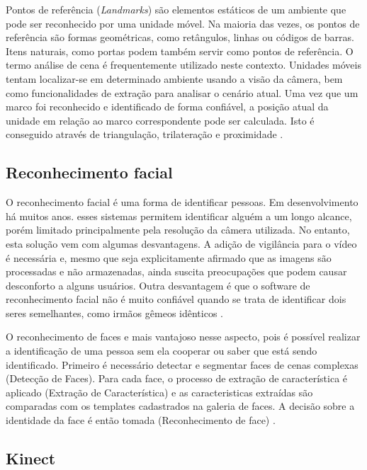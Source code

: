 Pontos de referência (\textit{Landmarks}) são elementos estáticos de um ambiente que pode ser reconhecido por uma unidade móvel. Na maioria das vezes, os pontos de referência são formas geométricas, como retângulos, linhas ou códigos de barras. Itens naturais, como portas podem também servir como pontos de referência. O termo  análise de cena é frequentemente utilizado neste contexto. Unidades móveis tentam localizar-se  em determinado ambiente usando a visão da câmera, bem como funcionalidades de extração para analisar o cenário atual. Uma vez que um marco foi reconhecido e identificado de forma confiável, a posição atual da unidade em relação ao marco correspondente pode ser calculada. Isto é conseguido através de triangulação, trilateração e proximidade \cite{linde2006aspects}.


 \subsection{Reconhecimento facial}\label{sec:recFacial}
O reconhecimento facial é uma forma de identificar pessoas. Em desenvolvimento há muitos anos. esses sistemas permitem identificar alguém a um longo alcance, porém limitado principalmente pela resolução da câmera utilizada. No entanto, esta solução vem com algumas desvantagens. A adição de vigilância para o vídeo é necessária e, mesmo que seja explicitamente afirmado que as imagens são processadas e não armazenadas, ainda suscita preocupações que podem causar desconforto a alguns usuários. Outra desvantagem é que o software de reconhecimento facial não é muito confiável quando se trata de identificar dois seres semelhantes, como irmãos gêmeos idênticos \cite{fitzpatrick2013real}.

O reconhecimento de faces e mais vantajoso nesse aspecto, pois é possível realizar a identificação de uma pessoa sem ela cooperar ou saber que está sendo identificado. Primeiro é necessário detectar e segmentar faces de cenas complexas (Detecção de Faces). Para cada face, o processo de extração de característica é aplicado (Extração de Característica) e as caracteristicas extraídas são comparadas com os templates cadastrados na galeria de faces. A decisão sobre a identidade da face é então tomada (Reconhecimento de face) \cite{cardia2015avaliaccao}.   
 
 \subsection{Kinect}\label{sec:kinect}
 
